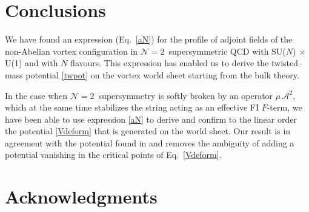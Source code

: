 \documentclass[12pt]{article}
\newcommand{\ntwon}{${\mathcal N}=2$}
\newcommand{\ma}{\mathcal{A}}
\newcommand{\sunu}{{\rm SU($N$) $\times$ U(1) }}
\begin{document}
\section{Conclusions}

	We have found an expression (Eq.~\eqref{aN}) for the profile of adjoint fields 
	of the non-Abelian vortex configuration in \ntwon\, supersymmetric QCD 
	with \sunu and with $ N $ flavours.
	This expression has enabled us to derive the twisted--mass potential \eqref{twpot} on the 
	vortex world sheet starting from the bulk theory.

	In the case when \ntwon\, supersymmetry is softly broken by an operator $ \mu\, \ma^2 $, 
	which at the same time stabilizes the string acting as an effective FI $ F $-term,
	we have been able to use expression \eqref{aN} to derive and confirm to the linear order
	the potential \eqref{Vdeform} that is generated on the world sheet.
	Our result is in agreement with the potential found in \cite{Shifman:2010kr}
	and removes the ambiguity of adding a potential vanishing in the critical points of Eq.~\eqref{Vdeform}.




\section*{Acknowledgments}
\end{document}
